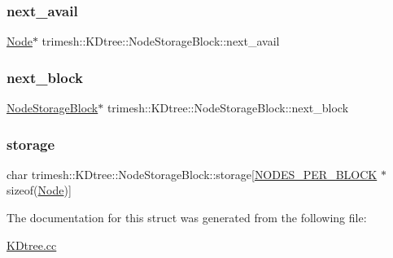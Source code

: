 \subsubsection{\texorpdfstring{next\+\_\+avail}{next\_avail}}
{\footnotesize\ttfamily \hyperlink{structtrimesh_1_1KDtree_1_1Node}{Node}$\ast$ trimesh\+::\+K\+Dtree\+::\+Node\+Storage\+Block\+::next\+\_\+avail}

\mbox{\label{structtrimesh_1_1KDtree_1_1NodeStorageBlock_aeb244f2daeda3453d676b40c7de5c3ad}} 
\subsubsection{\texorpdfstring{next\+\_\+block}{next\_block}}
{\footnotesize\ttfamily \hyperlink{structtrimesh_1_1KDtree_1_1NodeStorageBlock}{Node\+Storage\+Block}$\ast$ trimesh\+::\+K\+Dtree\+::\+Node\+Storage\+Block\+::next\+\_\+block}

\mbox{\label{structtrimesh_1_1KDtree_1_1NodeStorageBlock_a0958126dfe8d25e2f58c8f03f45869a0}} 
\subsubsection{\texorpdfstring{storage}{storage}}
{\footnotesize\ttfamily char trimesh\+::\+K\+Dtree\+::\+Node\+Storage\+Block\+::storage\mbox{[}\hyperlink{structtrimesh_1_1KDtree_1_1NodeStorageBlock_a53a3d1f98196691515bfb4c974102336abed02221dc8cfae72d1a32f807c5316f}{N\+O\+D\+E\+S\+\_\+\+P\+E\+R\+\_\+\+B\+L\+O\+CK} $\ast$sizeof(\hyperlink{structtrimesh_1_1KDtree_1_1Node}{Node})\mbox{]}}



The documentation for this struct was generated from the following file\+:\begin{DoxyCompactItemize}
\item 
\hyperlink{KDtree_8cc}{K\+Dtree.\+cc}\end{DoxyCompactItemize}

